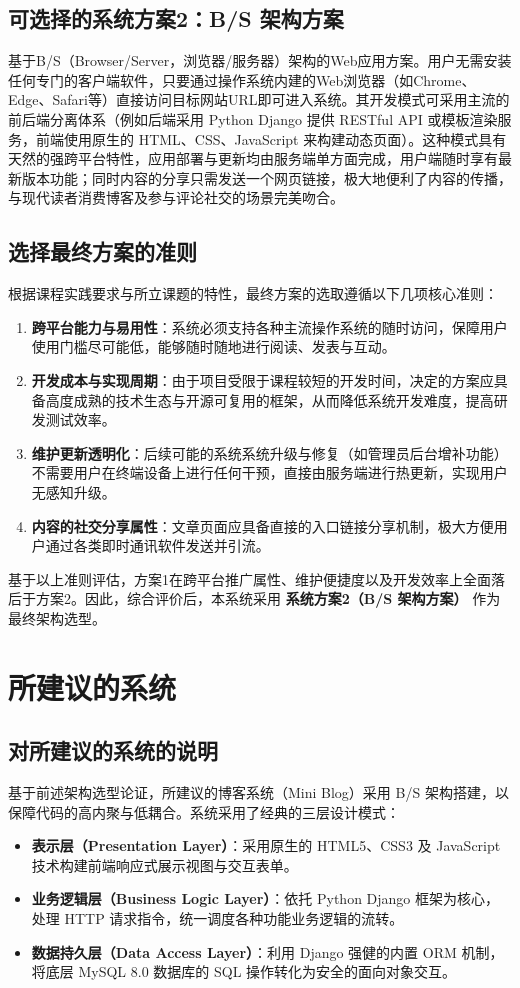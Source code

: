 \documentclass[12pt, a4paper]{ctexart}
\begin{document}
\subsection{可选择的系统方案2：B/S 架构方案}
基于B/S（Browser/Server，浏览器/服务器）架构的Web应用方案。用户无需安装任何专门的客户端软件，只要通过操作系统内建的Web浏览器（如Chrome、Edge、Safari等）直接访问目标网站URL即可进入系统。其开发模式可采用主流的前后端分离体系（例如后端采用 Python Django 提供 RESTful API 或模板渲染服务，前端使用原生的 HTML、CSS、JavaScript 来构建动态页面）。这种模式具有天然的强跨平台特性，应用部署与更新均由服务端单方面完成，用户端随时享有最新版本功能；同时内容的分享只需发送一个网页链接，极大地便利了内容的传播，与现代读者消费博客及参与评论社交的场景完美吻合。

\subsection{选择最终方案的准则}
根据课程实践要求与所立课题的特性，最终方案的选取遵循以下几项核心准则：
\begin{enumerate}
    \item \textbf{跨平台能力与易用性}：系统必须支持各种主流操作系统的随时访问，保障用户使用门槛尽可能低，能够随时随地进行阅读、发表与互动。
    \item \textbf{开发成本与实现周期}：由于项目受限于课程较短的开发时间，决定的方案应具备高度成熟的技术生态与开源可复用的框架，从而降低系统开发难度，提高研发测试效率。
    \item \textbf{维护更新透明化}：后续可能的系统系统升级与修复（如管理员后台增补功能）不需要用户在终端设备上进行任何干预，直接由服务端进行热更新，实现用户无感知升级。
    \item \textbf{内容的社交分享属性}：文章页面应具备直接的入口链接分享机制，极大方便用户通过各类即时通讯软件发送并引流。
\end{enumerate}
基于以上准则评估，方案1在跨平台推广属性、维护便捷度以及开发效率上全面落后于方案2。因此，综合评价后，本系统采用 \textbf{系统方案2（B/S 架构方案）} 作为最终架构选型。

\section{所建议的系统}
\subsection{对所建议的系统的说明}
基于前述架构选型论证，所建议的博客系统（Mini Blog）采用 B/S 架构搭建，以保障代码的高内聚与低耦合。系统采用了经典的三层设计模式：
\begin{itemize}
    \item \textbf{表示层（Presentation Layer）}：采用原生的 HTML5、CSS3 及 JavaScript 技术构建前端响应式展示视图与交互表单。
    \item \textbf{业务逻辑层（Business Logic Layer）}：依托 Python Django 框架为核心，处理 HTTP 请求指令，统一调度各种功能业务逻辑的流转。
    \item \textbf{数据持久层（Data Access Layer）}：利用 Django 强健的内置 ORM 机制，将底层 MySQL 8.0 数据库的 SQL 操作转化为安全的面向对象交互。
\end{itemize}
\end{document}
